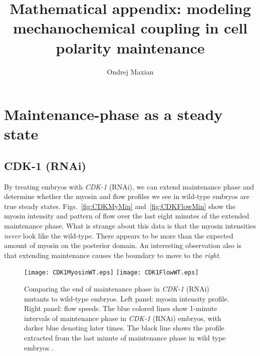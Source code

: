 \documentclass[11pt]{article}
\title{Mathematical appendix: modeling mechanochemical coupling in cell polarity maintenance  \vspace{-0.5 cm}}
\author{Ondrej Maxian  \vspace{-0.75 cm}}
\newcommand{\red}[1]{\color{red}#1\normalcolor}
\newcommand{\6}[1]{#1_{\text{6}}}
\newcommand{\3}[1]{#1_{\text{3}}}
\begin{document}
\maketitle 

\section{Maintenance-phase as a steady state}

\subsection{CDK-1 (RNAi)}
By treating embryos with \emph{CDK-1} (RNAi), we can extend maintenance phase and determine whether the myosin and flow profiles we see in wild-type embryos are true steady states. Figs.\ \ref{fig:CDKMyMin} and\ \ref{fig:CDKFlowMin} show the myosin intensity and pattern of flow over the last eight minutes of the extended maintenance phase. \red{What is strange about this data is that the myosin intensities \emph{never} look like the wild-type. There appears to be more than the expected amount of myosin on the posterior domain. An interesting observation also is that extending maintenance causes the boundary to move to the \emph{right}.}

\begin{figure}
\centering
\texttt{[image: CDK1MyosinWT.eps]}
\texttt{[image: CDK1FlowWT.eps]}
\caption{\label{fig:CDK1VsWT} Comparing the end of maintenance phase in \emph{CDK-1} (RNAi) mutants to wild-type embryos. Left panel: myosin intensity profile. Right panel: flow speeds. The blue colored lines show 1-minute intervals of maintenance phase in \emph{CDK-1} (RNAi) embryos, with darker blue denoting later times. The black line shows the profile extracted from the last minute of maintenance phase in wild type embryos \cite{sailer2015dynamic}.}
\end{figure}
\end{document}
